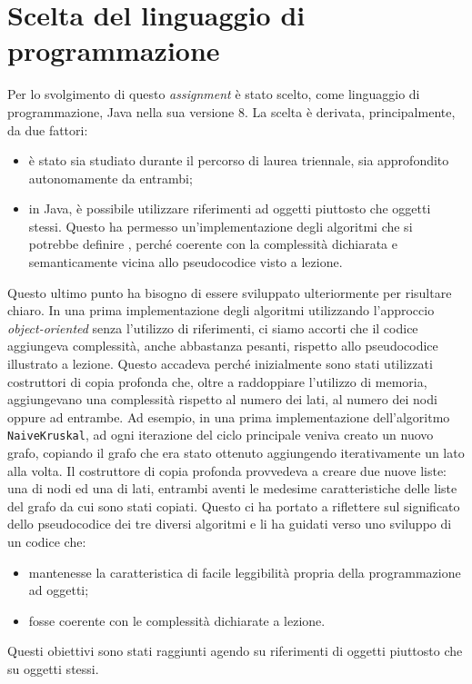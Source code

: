 \section{Scelta del linguaggio di programmazione}
Per lo svolgimento di questo \emph{assignment} è stato scelto, come linguaggio di programmazione, Java nella sua versione 8. La scelta è derivata, principalmente, da due fattori: 
\begin{itemize}
	\item è stato sia studiato durante il percorso di laurea triennale, sia approfondito autonomamente da entrambi;
	\item in Java, è possibile utilizzare riferimenti ad oggetti piuttosto che oggetti stessi. Questo ha permesso un'implementazione degli algoritmi che si potrebbe definire , perché coerente con la complessità dichiarata e semanticamente vicina allo pseudocodice visto a lezione. 
\end{itemize}
Questo ultimo punto ha bisogno di essere sviluppato ulteriormente per risultare chiaro. In una prima implementazione degli algoritmi utilizzando l'approccio \textit{object-oriented} senza l'utilizzo di riferimenti, ci siamo accorti che il codice aggiungeva complessità, anche abbastanza pesanti, rispetto allo pseudocodice illustrato a lezione. Questo accadeva perché inizialmente sono stati utilizzati costruttori di copia profonda che, oltre a raddoppiare l'utilizzo di memoria, aggiungevano una complessità rispetto al numero dei lati, al numero dei nodi oppure ad entrambe. \eqcapo
Ad esempio, in una prima implementazione dell'algoritmo \texttt{NaiveKruskal}, ad ogni iterazione del ciclo principale veniva creato un nuovo grafo, copiando il grafo che era stato ottenuto aggiungendo iterativamente un lato alla volta. Il costruttore di copia profonda provvedeva a creare due nuove liste: una di nodi ed una di lati, entrambi aventi le medesime caratteristiche delle liste del grafo da cui sono stati copiati.\eqcapo
 Questo ci ha portato a riflettere sul significato dello pseudocodice dei tre diversi algoritmi e li ha guidati verso uno sviluppo di un codice che:
 \begin{itemize}
 	\item mantenesse la caratteristica di facile leggibilità propria della programmazione ad oggetti;
	\item fosse coerente con le complessità dichiarate a lezione.
 \end{itemize}
Questi obiettivi sono stati raggiunti agendo su riferimenti di oggetti piuttosto che su oggetti stessi.
\newpage
